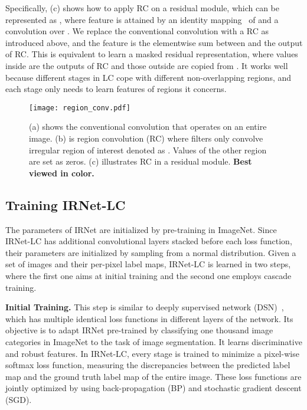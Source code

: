 \documentclass[10pt,twocolumn,letterpaper]{article}
\begin{document}
Specifically, (c) shows how to apply RC on a residual module, which can be represented as , where feature  is attained by an identity mapping~\cite{He2015} of  and a convolution over .
We replace the conventional convolution with a RC as introduced above, and the feature  is the elementwise sum between  and the output of RC.
This is equivalent to learn a masked residual representation, where values inside  are the outputs of RC and those outside  are copied from .
It works well because different stages in LC cope with different non-overlapping regions, and each stage only needs to learn features of regions it concerns.







\begin{figure}[t]
    \centering
    \texttt{[image: region\_conv.pdf]}
    \vskip -0.2cm
    \caption{\small{(a) shows the conventional convolution that operates on an entire image. (b) is region convolution (RC) where filters only convolve irregular region of interest denoted as . Values of the other region are set as zeros. (c) illustrates RC in a residual module. \textbf{Best viewed in color.}}}
    \label{fig:region_conv}
    \vspace{-12pt}
\end{figure}




\subsection{Training IRNet-LC}\label{sec:training}
The parameters of IRNet are initialized by pre-training in ImageNet.
Since IRNet-LC has additional convolutional layers stacked before each loss function, their parameters are initialized by sampling from a normal distribution.
Given a set of images and their per-pixel label maps, IRNet-LC is learned in two steps, where the first one aims at initial training and the second one employs cascade training.



\noindent
\textbf{Initial Training.}
This step is similar to deeply supervised network (DSN)~\cite{lee2015deeply}, which has multiple identical loss functions in different layers of the network.
Its objective is to adapt IRNet pre-trained by classifying one thousand image categories in ImageNet to the task of image segmentation.
It learns discriminative and robust features.
In IRNet-LC, every stage is trained to minimize a pixel-wise softmax loss function, measuring the discrepancies between the predicted label map and the ground truth label map of the entire image.
These loss functions are jointly optimized by using back-propagation (BP) and stochastic gradient descent (SGD).
\end{document}
